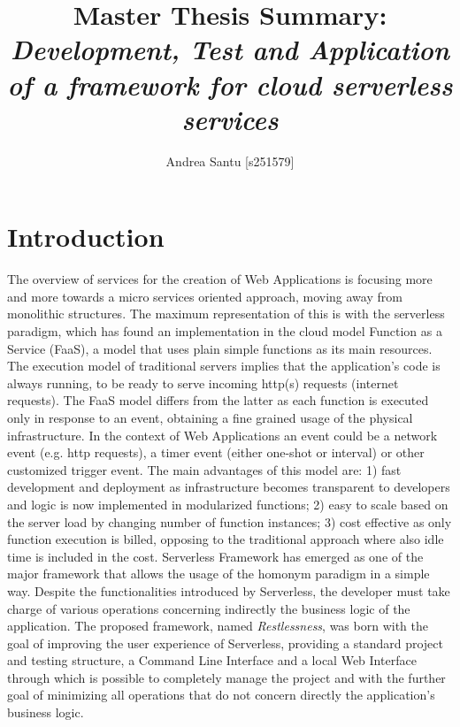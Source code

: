 \documentclass{article}
\begin{document}
\title{Master Thesis Summary: \textit{Development, Test and Application of a framework for cloud serverless services}}

\author{Andrea Santu [s251579]}

\maketitle

\section{Introduction}
The overview of services for the creation of Web Applications is focusing more
and more towards a micro services oriented approach, moving away from monolithic
structures.
The maximum representation of this is with the serverless paradigm, which has
found an implementation in the cloud model Function as a Service (FaaS), a model
that uses plain simple functions as its main resources. 
The execution model of traditional servers implies that the application's code is always running, to be ready to serve incoming http(s) requests (internet requests). 
The FaaS model differs
from the latter as each function is executed only in response to an event, obtaining
a fine grained usage of the physical infrastructure. 
In the context of Web
Applications an event could be a network event (e.g. http requests), a timer event (either one-shot or interval) or other customized trigger event.
The main advantages of this model are: 1) fast development and deployment as infrastructure becomes transparent to developers and logic is now implemented in modularized functions; 2) easy to scale based on the server load by changing number of function instances; 3)
cost effective as only function execution is billed, opposing to the traditional
approach where also idle time is included in the cost.
Serverless Framework has emerged as one of the major framework that allows the
usage of the homonym paradigm in a simple way.
Despite the functionalities introduced by Serverless, the developer must take
charge of various operations concerning indirectly the business logic of the
application.
The proposed framework, named \textit{Restlessness}, was born with the goal of
improving the user experience of Serverless, providing a standard project and testing
structure, a Command Line Interface and a local Web Interface through which is
possible to completely manage the project and with the further goal of minimizing
all operations that do not concern directly the application's business logic.
\end{document}
